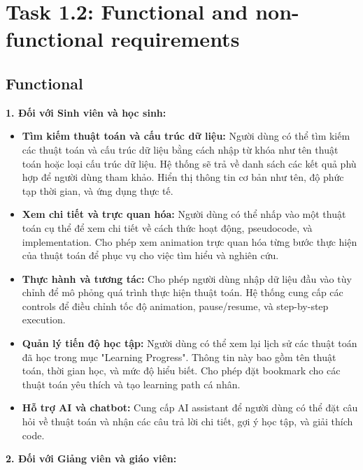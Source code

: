 \section{Task 1.2: Functional and non-functional requirements}
\label{sec:requirements}

\subsection{Functional}
\label{subsec:functional-req}

\textbf{1. Đối với Sinh viên và học sinh:}

\begin{itemize}
\item \textbf{Tìm kiếm thuật toán và cấu trúc dữ liệu:} Người dùng có thể tìm kiếm các thuật toán và cấu trúc dữ liệu bằng cách nhập từ khóa như tên thuật toán hoặc loại cấu trúc dữ liệu. Hệ thống sẽ trả về danh sách các kết quả phù hợp để người dùng tham khảo. Hiển thị thông tin cơ bản như tên, độ phức tạp thời gian, và ứng dụng thực tế.

\item \textbf{Xem chi tiết và trực quan hóa:} Người dùng có thể nhấp vào một thuật toán cụ thể để xem chi tiết về cách thức hoạt động, pseudocode, và implementation. Cho phép xem animation trực quan hóa từng bước thực hiện của thuật toán để phục vụ cho việc tìm hiểu và nghiên cứu.

\item \textbf{Thực hành và tương tác:} Cho phép người dùng nhập dữ liệu đầu vào tùy chỉnh để mô phỏng quá trình thực hiện thuật toán. Hệ thống cung cấp các controls để điều chỉnh tốc độ animation, pause/resume, và step-by-step execution.

\item \textbf{Quản lý tiến độ học tập:} Người dùng có thể xem lại lịch sử các thuật toán đã học trong mục "Learning Progress". Thông tin này bao gồm tên thuật toán, thời gian học, và mức độ hiểu biết. Cho phép đặt bookmark cho các thuật toán yêu thích và tạo learning path cá nhân.

\item \textbf{Hỗ trợ AI và chatbot:} Cung cấp AI assistant để người dùng có thể đặt câu hỏi về thuật toán và nhận các câu trả lời chi tiết, gợi ý học tập, và giải thích code.
\end{itemize}

\textbf{2. Đối với Giảng viên và giáo viên:}

